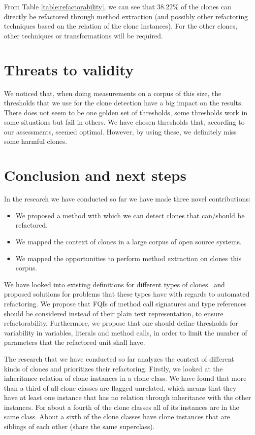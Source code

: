 \documentclass[a4paper]{article}
\begin{document}
From Table \ref{table:refactorability}, we can see that 38.22\% of the clones can directly be refactored through method extraction (and possibly other refactoring techniques based on the relation of the clone instances). For the other clones, other techniques or transformations will be required.

\section{Threats to validity}\label{chap:threatstovalidity}
We noticed that, when doing measurements on a corpus of this size, the thresholds that we use for the clone detection have a big impact on the results. There does not seem to be one golden set of thresholds, some thresholds work in some situations but fail in others. We have chosen thresholds that, according to our assessments, seemed optimal. However, by using these, we definitely miss some harmful clones.

\section{Conclusion and next steps}\label{chap:conclusion}
In the research we have conducted so far we have made three novel contributions:
\begin{itemize}
    \item We proposed a method with which we can detect clones that can/should be refactored.
    \item We mapped the context of clones in a large corpus of open source systems.
    \item We mapped the opportunities to perform method extraction on clones this corpus.
\end{itemize}

We have looked into existing definitions for different types of clones~\cite{roy2007survey} and proposed solutions for problems that these types have with regards to automated refactoring. We propose that FQIs of method call signatures and type references should be considered instead of their plain text representation, to ensure refactorability. Furthermore, we propose that one should define thresholds for variability in variables, literals and method calls, in order to limit the number of parameters that the refactored unit shall have.

The research that we have conducted so far analyzes the context of different kinds of clones and prioritizes their refactoring. Firstly, we looked at the inheritance relation of clone instances in a clone class. We have found that more than a third of all clone classes are flagged unrelated, which means that they have at least one instance that has no relation through inheritance with the other instances. For about a fourth of the clone classes all of its instances are in the same class. About a sixth of the clone classes have clone instances that are siblings of each other (share the same superclass).
\end{document}
